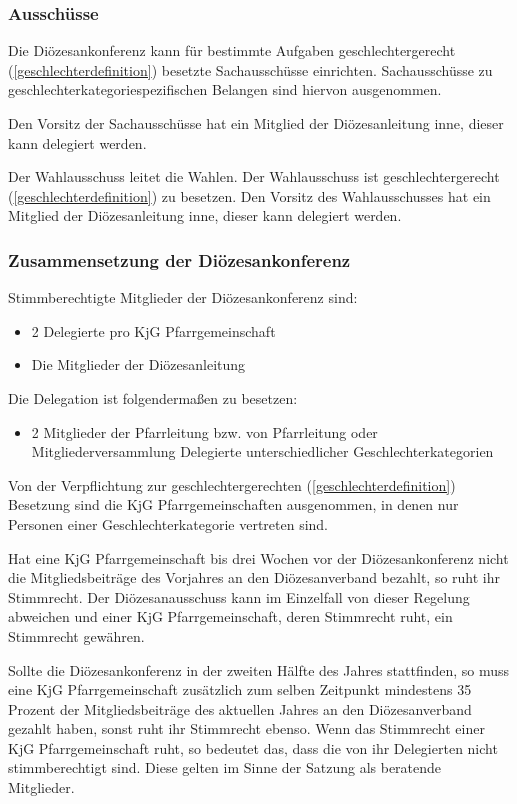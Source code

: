 \documentclass[12pt]{report}
\begin{document}
\begin{justify}
\subsubsection{Ausschüsse}
Die Diözesankonferenz kann für bestimmte Aufgaben geschlechtergerecht 
(\ref{geschlechterdefinition}) besetzte Sachausschüsse einrichten.
Sachausschüsse zu geschlechterkategoriespezifischen Belangen sind hiervon ausgenommen.

Den Vorsitz der Sachausschüsse hat ein Mitglied der Diözesanleitung inne, dieser kann delegiert
werden.

Der Wahlausschuss leitet die Wahlen. Der Wahlausschuss ist geschlechtergerecht (\ref{geschlechterdefinition}) zu besetzen. Den Vorsitz
des Wahlausschusses hat ein Mitglied der Diözesanleitung inne, dieser kann delegiert werden.

\subsubsection{Zusammensetzung der Diözesankonferenz}
Stimmberechtigte Mitglieder der Diözesankonferenz sind:
\begin{itemize}
  \item 2 Delegierte pro KjG Pfarrgemeinschaft
  \item Die Mitglieder der Diözesanleitung
\end{itemize}

Die Delegation ist folgendermaßen zu besetzen:
\begin{itemize}
  \item{ 2 Mitglieder der Pfarrleitung bzw. von Pfarrleitung oder Mitgliederversammlung
        Delegierte unterschiedlicher Geschlechterkategorien}
\end{itemize}

Von der Verpflichtung zur geschlechtergerechten (\ref{geschlechterdefinition}) Besetzung
sind die KjG Pfarrgemeinschaften ausgenommen,
in denen nur Personen einer Geschlechterkategorie vertreten sind.

Hat eine KjG Pfarrgemeinschaft bis drei Wochen vor der Diözesankonferenz nicht
die Mitgliedsbeiträge des Vorjahres an den Diözesanverband bezahlt, so ruht ihr
Stimmrecht. Der Diözesanausschuss kann im Einzelfall von dieser
Regelung abweichen und einer KjG Pfarrgemeinschaft, deren Stimmrecht ruht, ein
Stimmrecht gewähren.

Sollte die Diözesankonferenz in der zweiten Hälfte des Jahres stattfinden, so muss eine KjG Pfarrgemeinschaft zusätzlich zum selben Zeitpunkt mindestens 35 Prozent der Mitgliedsbeiträge des aktuellen Jahres an den Diözesanverband gezahlt haben, sonst ruht ihr Stimmrecht ebenso.
Wenn das Stimmrecht einer KjG Pfarrgemeinschaft ruht, so bedeutet das, dass die von ihr Delegierten nicht stimmberechtigt sind. Diese gelten im Sinne der Satzung als beratende Mitglieder.


\end{justify}
\end{document}
